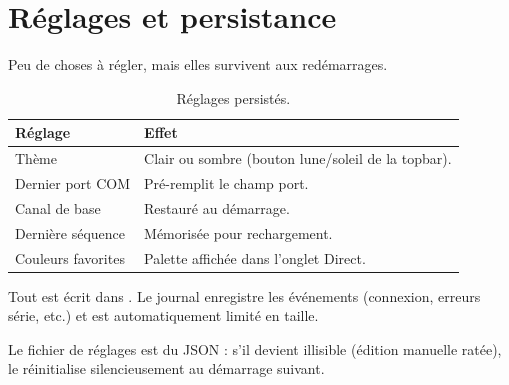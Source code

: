 \chapter{Réglages et persistance}
\label{ch:reglages}

Peu de choses à régler, mais elles survivent aux redémarrages.

\begin{table}[H]
  \centering
  \begin{tabular}{@{}ll@{}}
    \toprule
    \textbf{Réglage} & \textbf{Effet} \\
    \midrule
    Thème & Clair ou sombre (bouton lune/soleil de la topbar). \\
    Dernier port COM & Pré-remplit le champ port. \\
    Canal de base & Restauré au démarrage. \\
    Dernière séquence & Mémorisée pour rechargement. \\
    Couleurs favorites & Palette affichée dans l'onglet Direct. \\
    \bottomrule
  \end{tabular}
  \caption{Réglages persistés.}
\end{table}

Tout est écrit dans . Le journal 
enregistre les événements (connexion, erreurs série, etc.) et est automatiquement
limité en taille.

\begin{avertissement}
Le fichier de réglages est du JSON : s'il devient illisible (édition manuelle
ratée), \Icare{} le réinitialise silencieusement au démarrage suivant.
\end{avertissement}
